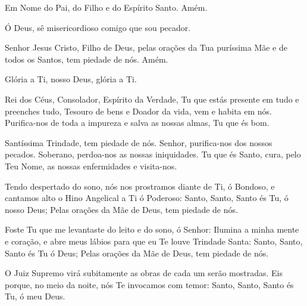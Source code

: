 \documentclass{subfiles}
\begin{document}

 
Em Nome do Pai, do Filho e do Espírito Santo. Amém. 
 
 
Ó Deus, sê misericordioso comigo que sou pecador. 
  
Senhor Jesus Cristo, Filho de Deus, pelas orações da Tua puríssima Mãe 
e de todos os Santos, tem piedade de nós. Amém. 
 
Glória a Ti, nosso Deus, glória a Ti. 
 
Rei dos Céus, Consolador, Espírito da Verdade, Tu que estás presente 
em tudo e preenches tudo, Tesouro de bens e Doador da vida, vem e habita 
em nós. Purifica-nos de toda a impureza e salva as nossas almas, Tu que és 
bom. 
 
\trisagion{} \thrice{}

Santíssima Trindade, tem piedade de nós. Senhor, purifica-nos dos 
nossos pecados. Soberano, perdoa-nos as nossas iniquidades. Tu que és Santo, 
cura, pelo Teu Nome, as nossas enfermidades e visita-nos.
 
\mercy{} 

\Doxology{}
 
\ourFather{}


Tendo despertado do sono, nós nos prostramos diante de Ti, ó 
Bondoso, e cantamos alto o Hino Angelical a Ti ó Poderoso: Santo, Santo, Santo 
és Tu, ó nosso Deus; Pelas orações da Mãe de Deus, tem piedade de nós. 
 
\doxology{}

Foste Tu que me levantaste do leito e do sono, ó Senhor: Ilumina a minha mente e
coração, e abre meus lábios para que eu Te louve Trindade Santa: Santo, Santo,
Santo és Tu ó Deus; Pelas orações da Mãe de Deus, tem piedade de nós. 
 
\nowandever{}

O Juiz Supremo virá subitamente as obras de cada um serão mostradas. Eis porque,
no meio da noite, nós Te invocamos com temor: Santo, Santo, Santo és Tu, ó meu
Deus. 
\end{document}
